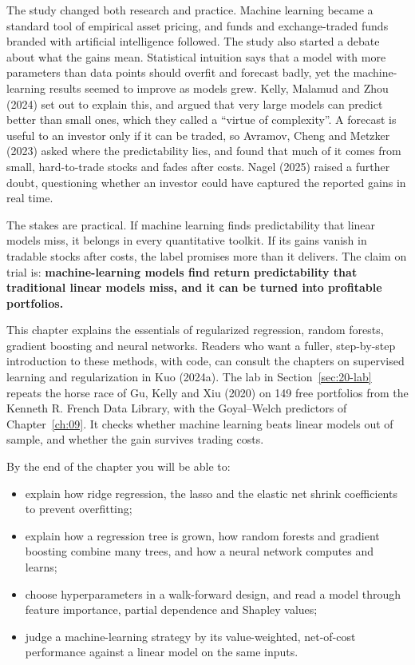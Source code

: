 The study changed both research and practice. Machine learning became a standard tool of empirical asset pricing, and funds and exchange-traded funds branded with artificial intelligence followed. The study also started a debate about what the gains mean. Statistical intuition says that a model with more parameters than data points should overfit and forecast badly, yet the machine-learning results seemed to improve as models grew. Kelly, Malamud and Zhou (2024) set out to explain this, and argued that very large models can predict better than small ones, which they called a ``virtue of complexity''. A forecast is useful to an investor only if it can be traded, so Avramov, Cheng and Metzker (2023) asked where the predictability lies, and found that much of it comes from small, hard-to-trade stocks and fades after costs. Nagel (2025) raised a further doubt, questioning whether an investor could have captured the reported gains in real time.

The stakes are practical. If machine learning finds predictability that linear models miss, it belongs in every quantitative toolkit. If its gains vanish in tradable stocks after costs, the label promises more than it delivers. The claim on trial is: \textbf{machine-learning models find return predictability that traditional linear models miss, and it can be turned into profitable portfolios.}

This chapter explains the essentials of regularized regression, random forests, gradient boosting and neural networks. Readers who want a fuller, step-by-step introduction to these methods, with code, can consult the chapters on supervised learning and regularization in Kuo (2024a). The lab in Section~\ref{sec:20-lab} repeats the horse race of Gu, Kelly and Xiu (2020) on 149 free portfolios from the Kenneth R. French Data Library, with the Goyal--Welch predictors of Chapter~\ref{ch:09}. It checks whether machine learning beats linear models out of sample, and whether the gain survives trading costs.

By the end of the chapter you will be able to:

\begin{itemize}
  \item explain how ridge regression, the lasso and the elastic net shrink coefficients to prevent overfitting;
  \item explain how a regression tree is grown, how random forests and gradient boosting combine many trees, and how a neural network computes and learns;
  \item choose hyperparameters in a walk-forward design, and read a model through feature importance, partial dependence and Shapley values;
  \item judge a machine-learning strategy by its value-weighted, net-of-cost performance against a linear model on the same inputs.
\end{itemize}

